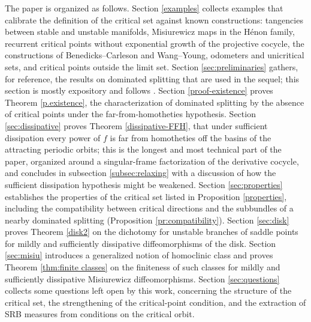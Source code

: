 \documentclass[a4paper,11pt]{article}
\newtheorem{theorem}{Theorem}
\theoremstyle{definition}
\def\La{\Lambda}
\def\La{\Lambda}
\def\emp{\emptyset}
\begin{document}
The paper is organized as follows. Section \ref{examples} collects examples that calibrate the definition of the critical set against known constructions: tangencies between stable and unstable manifolds, Misiurewicz maps in the H\'enon family, recurrent critical points without exponential growth of the projective cocycle, the constructions of Benedicks--Carleson and Wang--Young, odometers and unicritical sets, and critical points outside the limit set. Section \ref{sec:preliminaries} gathers, for reference, the results on dominated splitting that are used in the sequel; this section is mostly expository and follows \cite{PS1,PS2}. Section \ref{proof-existence} proves Theorem \ref{p.existence}, the characterization of dominated splitting by the absence of critical points under the far-from-homotheties hypothesis. Section \ref{sec:dissipative} proves Theorem \ref{dissipative-FFH}, that under sufficient dissipation every power of $f$ is far from homotheties off the basins of the attracting periodic orbits; this is the longest and most technical part of the paper, organized around a singular-frame factorization of the derivative cocycle, and concludes in subsection \ref{subsec:relaxing} with a discussion of how the sufficient dissipation hypothesis might be weakened. Section \ref{sec:properties} establishes the properties of the critical set listed in Proposition \ref{properties}, including the compatibility between critical directions and the subbundles of a nearby dominated splitting (Proposition \ref{pr:compatibility}). Section \ref{sec:disk} proves Theorem \ref{disk2} on the dichotomy for unstable branches of saddle points for mildly and sufficiently dissipative diffeomorphisms of the disk. Section \ref{sec:misiu} introduces a generalized notion of homoclinic class and proves Theorem \ref{thm:finite classes} on the finiteness of such classes for mildly and sufficiently dissipative Misiurewicz diffeomorphisms. Section \ref{sec:questions} collects some questions left open by this work, concerning the structure of the critical set, the strengthening of the critical-point condition, and the extraction of SRB measures from conditions on the critical orbit.


 
\end{document}
